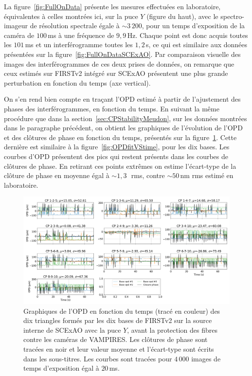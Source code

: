 La figure~\ref{fig:FullOnData} présente les mesures effectuées en laboratoire, équivalentes à celles montrées ici, sur la puce $Y$ (figure du haut), avec le spectro-imageur de résolution spectrale égale à $\sim 3\,200$, pour un temps d'exposition de la caméra de $100 \,$ms à une fréquence de $9,9 \,$Hz. Chaque point est donc acquis toutes les $101 \,$ms et un interférogramme toutes les $1,2 \,$s, ce qui est similaire aux données présentées sur la figure~\ref{fig:FullOnDataSCExAO}. Par comparaison visuelle des images des interférogrammes de ces deux prises de données, on remarque que ceux estimés sur \ac{FIRSTv2} intégré sur \ac{SCExAO} présentent une plus grande perturbation en fonction du temps (axe vertical). 

On s'en rend bien compte en traçant l'\ac{OPD} estimé à partir de l'ajustement des phases des interférogrammes, en fonction du temps. En suivant la même procédure que dans la section~\ref{sec:CPStabilityMeudon}, sur les données montrées dans le paragraphe précédent, on obtient les graphiques de l'évolution de l'\ac{OPD} et des clôtures de phase en fonction du temps, présentés sur la figure~\ref{fig:OPDfitVStimeSubaru}. Cette dernière est similaire à la figure~\ref{fig:OPDfitVStime}, pour les dix bases. Les courbes d'\ac{OPD} présentent des pics qui restent présents dans les courbes de clôtures de phase. En retirant ces points extrêmes on estime l'écart-type de la clôture de phase en moyenne égal à $\sim 1,3 \,$\um~rms, contre $\sim 50 \,$nm rms estimé en laboratoire.

\begin{figure}[ht!]
    \centering
    \includegraphics[width=\figwidth]{Figure_Chap5/20220225_SuperK_FullOnData_OPDFitCPvsTime_Pola1_Base_LaTex.png}
    \caption[Graphiques de l'OPD en fonction du temps des dix triangles formés par les dix bases de FIRSTv2 sur la source interne de SCExAO avec la puce $Y$, avant la protection des fibres.]{Graphiques de l'OPD en fonction du temps (tracé en couleur) des dix triangles formés par les dix bases de FIRSTv2 sur la source interne de SCExAO avec la puce $Y$, avant la protection des fibres contre les caméras de VAMPIRES. Les clôtures de phase sont tracées en noir et leur valeur moyenne et l'écart-type sont écrits dans les sous-titres. Les courbes sont tracées pour $4\,000$ images de temps d'exposition égal à $20 \,$ms.}
    \label{fig:OPDfitVStimeSubaru}
\end{figure}


